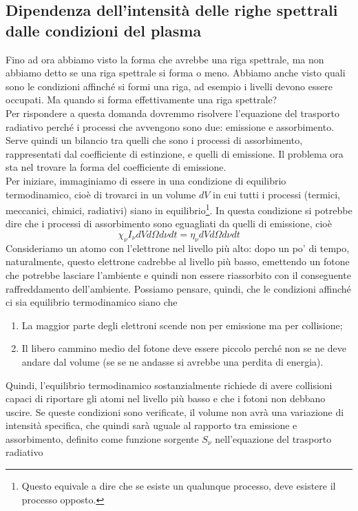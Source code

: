\documentclass[a4paper,11pt]{article}
\begin{document}
\subsection{Dipendenza dell'intensità delle righe spettrali dalle condizioni del plasma}
Fino ad ora abbiamo visto la forma che avrebbe una riga spettrale, ma non abbiamo detto se una riga spettrale si forma o meno. Abbiamo anche visto quali sono le condizioni affinché si formi una riga, ad esempio i livelli devono essere occupati. Ma quando si forma effettivamente una riga spettrale? \\
Per rispondere a questa domanda dovremmo risolvere l'equazione del trasporto radiativo perché i processi che avvengono sono due: emissione e assorbimento. Serve quindi un bilancio tra quelli che sono i processi di assorbimento, rappresentati dal coefficiente di estinzione, e quelli di emissione. Il problema ora sta nel trovare la forma del coefficiente di emissione.\\ 
Per iniziare, immaginiamo di essere in una condizione di equilibrio termodinamico, cioè di trovarci in un volume \(dV\) in cui tutti i processi (termici, meccanici, chimici, radiativi) siano in equilibrio\footnote{Questo equivale a dire che se esiste un qualunque processo, deve esistere il processo opposto.}. In questa condizione si potrebbe dire che i processi di assorbimento sono eguagliati da quelli di emissione, cioè 
\[\chi_\nu I_\nu dVd\Omega d\nu dt= \eta_\nu dVd\Omega d\nu dt\]
Consideriamo un atomo con l'elettrone nel livello più alto: dopo un po' di tempo, naturalmente, questo elettrone cadrebbe al livello più basso, emettendo un fotone che potrebbe lasciare l'ambiente e quindi non essere riassorbito con il conseguente raffreddamento dell'ambiente. Possiamo pensare, quindi, che le condizioni affinché ci sia equilibrio termodinamico siano che 
\begin{enumerate}
\item La maggior parte degli elettroni scende non per emissione ma per collisione;
\item Il libero cammino medio del fotone deve essere piccolo perché non se ne deve andare dal volume (se se ne andasse si avrebbe una perdita di energia).
\end{enumerate}
Quindi, l'equilibrio termodinamico sostanzialmente richiede di avere collisioni capaci di riportare gli atomi nel livello più basso e che i fotoni non debbano uscire. Se queste condizioni sono verificate, il volume non avrà una variazione di intensità specifica, che quindi sarà uguale al rapporto tra emissione e assorbimento, definito come funzione sorgente \(S_\nu\) nell'equazione del trasporto radiativo
\end{document}
